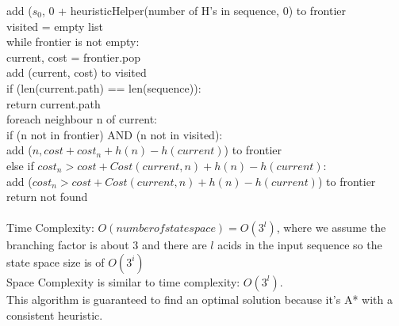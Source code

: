 \documentclass[11pt]{article}
\begin{document}
\begin{onehalfspace}
\begin{itemize}
    \tab add ($s_0$, 0 + heuristicHelper(number of H's in sequence, 0) to frontier\\
    \tab visited = empty list\\
    \tab while frontier is not empty: \\
    \tab\tab current, cost = frontier.pop \\
    \tab\tab add (current, cost) to visited \\
    \tab\tab if (len(current.path) == len(sequence)): \\
    \tab\tab\tab return current.path \\
    \tab\tab foreach neighbour n of current: \\
    \tab\tab\tab if (n not in frontier) AND (n not in visited): \\
    \tab\tab\tab\tab add ($n, cost + cost_n + h(n) - h(current)$) to frontier \\
    \tab\tab\tab else if $cost_n > cost + Cost(current, n) + h(n) - h(current)$: \\
    \tab\tab\tab\tab add ($cost_n > cost + Cost(current, n) + h(n) - h(current)$) to frontier \\
    \tab return not found \\ \\
    Time Complexity: $O(number of state space) = O(3^l)$, where we assume the branching factor is about 3 and there are $l$ acids in the input sequence so the state space size is of $O(3^i)$ \\
    Space Complexity is similar to time complexity: $O(3^l)$. \\
    This algorithm is guaranteed to find an optimal solution because it's A* with a consistent heuristic.
    \end{itemize}
\end{onehalfspace}
\end{document}
